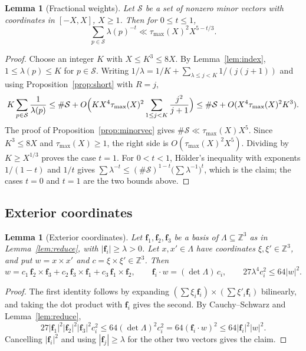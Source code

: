 \documentclass[11pt]{article}
\newtheorem{lemma}[theorem]{Lemma}
\theoremstyle{definition}
\theoremstyle{remark}
\begin{document}
\begin{lemma}[Fractional weights]\label{lem:weights}
Let $\mathcal S$ be a set of nonzero minor vectors with coordinates in $[-X,X]$, $X\ge1$.
Then for $0\le t\le1$,
\[
 \sum_{p\in\mathcal S}\lambda(p)^{-t}\ll\tau_{\max}(X)^2X^{5-t/3}.
\]
\end{lemma}

\begin{proof}
Choose an integer $K$ with $X\le K^3\le8X$. By Lemma~\ref{lem:index}, $1\le\lambda(p)\le K$
for $p\in\mathcal S$. Writing $1/\lambda=1/K+\sum_{\lambda\le j<K}1/(j(j+1))$ and using
Proposition~\ref{prop:short} with $R=j$,
\[
 K\sum_{p\in\mathcal S}\frac1{\lambda(p)}
 \le\#\mathcal S+O\Bigl(KX^4\tau_{\max}(X)^2\sum_{1\le j<K}\frac{j^2}{j+1}\Bigr)
 \le\#\mathcal S+O(X^4\tau_{\max}(X)^2K^3) .
\]
The proof of Proposition~\ref{prop:minorvec} gives
$\#\mathcal S\ll\tau_{\max}(X)X^5$. Since $K^3\le8X$ and $\tau_{\max}(X)\ge1$,
the right side is $O(\tau_{\max}(X)^2X^5)$. Dividing by $K\ge X^{1/3}$
proves the case $t=1$. For $0<t<1$, H\"older's inequality
with exponents $1/(1-t)$ and $1/t$ gives
$\sum\lambda^{-t}\le(\#\mathcal S)^{1-t}\bigl(\sum\lambda^{-1}\bigr)^t$, which is the claim;
the cases $t=0$ and $t=1$ are the two bounds above.
\end{proof}

\subsection{Exterior coordinates}\label{sec:latticeexterior}

\begin{lemma}[Exterior coordinates]\label{lem:exterior}
Let $\mathbf f_1,\mathbf f_2,\mathbf f_3$ be a basis of $\Lambda\subseteq\mathbb Z^3$ as in
Lemma~\ref{lem:reduce}, with $|\mathbf f_i|\ge\lambda>0$. Let $x,x'\in\Lambda$ have coordinates
$\xi,\xi'\in\mathbb Z^3$, and put $w=x\times x'$ and $c=\xi\times\xi'\in\mathbb Z^3$. Then
\[
 w=c_1\,\mathbf f_2\times\mathbf f_3+c_2\,\mathbf f_3\times\mathbf f_1+c_3\,\mathbf f_1\times\mathbf f_2,\qquad
 \mathbf f_i\cdot w=(\det\Lambda)\,c_i,\qquad 27\lambda^4c_i^2\le64|w|^2 .
\]
\end{lemma}

\begin{proof}
The first identity follows by expanding $(\sum\xi_i\mathbf f_i)\times(\sum\xi'_i\mathbf f_i)$
bilinearly, and taking the dot product with $\mathbf f_i$ gives the second. By Cauchy--Schwarz and
Lemma~\ref{lem:reduce},
\[
 27|\mathbf f_1|^2|\mathbf f_2|^2|\mathbf f_3|^2c_i^2\le64(\det\Lambda)^2c_i^2=64(\mathbf f_i\cdot w)^2
 \le64|\mathbf f_i|^2|w|^2 .
\]
Cancelling $|\mathbf f_i|^2$ and using $|\mathbf f_j|\ge\lambda$ for the other two vectors gives the
claim.
\end{proof}
\end{document}
